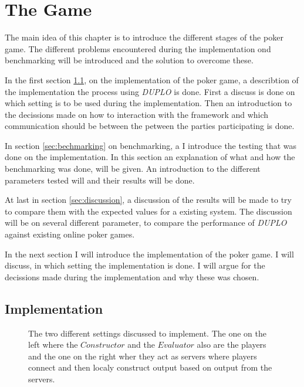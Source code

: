 \documentclass[twoside,11pt,openright]{report}
\newcommand{\DUPLO}{\textit{DUPLO} }
\begin{document}
\chapter{The Game}
\label{ch:implementation}
The main idea of this chapter is to introduce the different stages of the poker game. The different problems encountered during the implementation ond benchmarking will be introduced and the solution to overcome these.

In the first section \ref{sec:poker_imp}, on the implementation of the poker game, a describtion of the implementation the process using \DUPLO is done. First a discuss is done on which setting is to be used during the implementation. Then an introduction to the decissions made on how to interaction with the framework and which communication should be between the petween the parties participating is done.

In section \ref{sec:bechmarking} on benchmarking, a I introduce the testing that was done on the implementation. In this section an explanation of what and how the benchmarking was done, will be given. An introduction to the different parameters tested will and their results will be done.

At last in section \ref{sec:discussion}, a discussion of the results will be made to try to compare them with the expected values for a existing system. The discussion will be on several different parameter, to compare the performance of \DUPLO against existing online poker games.

\bigskip

In the next section I will introduce the implementation of the poker game. I will discuss, in which setting the implementation is done. I will argue for the decissions made during the implementation and why these was chosen. 

\section{Implementation}
\label{sec:poker_imp}

\begin{figure}[t]
\centering

\caption{The two different settings discussed to implement. The one on the left where the $Constructor$ and the $Evaluator$ also are the players and the one on the right wher they act as servers where players connect and then localy construct output based on output from the servers.}
\label{fig:poker_setting}
\end{figure}
\end{document}
